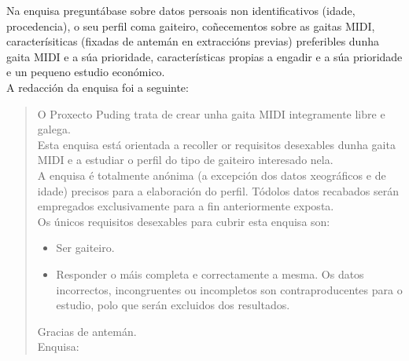 Na enquisa preguntábase sobre datos persoais non identificativos (idade,
procedencia), o seu perfil coma gaiteiro, coñecementos sobre as gaitas MIDI,
caracterísiticas (fixadas de antemán en extraccións previas) preferibles dunha
gaita MIDI e a súa prioridade, características propias a engadir e a súa
prioridade e un pequeno estudio económico.\\

A redacción da enquisa foi a seguinte:

\begin{quotation}
\itshape

 O Proxecto Puding trata de crear unha gaita MIDI integramente libre e galega.\\

 Esta enquisa está orientada a recoller or requisitos desexables dunha gaita
 MIDI e a estudiar o perfil do tipo de gaiteiro interesado nela.\\

 A enquisa é totalmente anónima (a excepción dos datos xeográficos e de idade)
 precisos para a elaboración do perfil. Tódolos datos recabados serán
 empregados exclusivamente para a fin anteriormente exposta.\\

 Os únicos requisitos desexables para cubrir esta enquisa son:

 \begin{itemize}
  \item Ser gaiteiro.
  \item Responder o máis completa e correctamente a mesma. Os datos
        incorrectos, incongruentes ou incompletos son contraproducentes para o
        estudio, polo que serán excluidos dos resultados.
 \end{itemize}

 Gracias de antemán.\\

 Enquisa:


\end{quotation}
